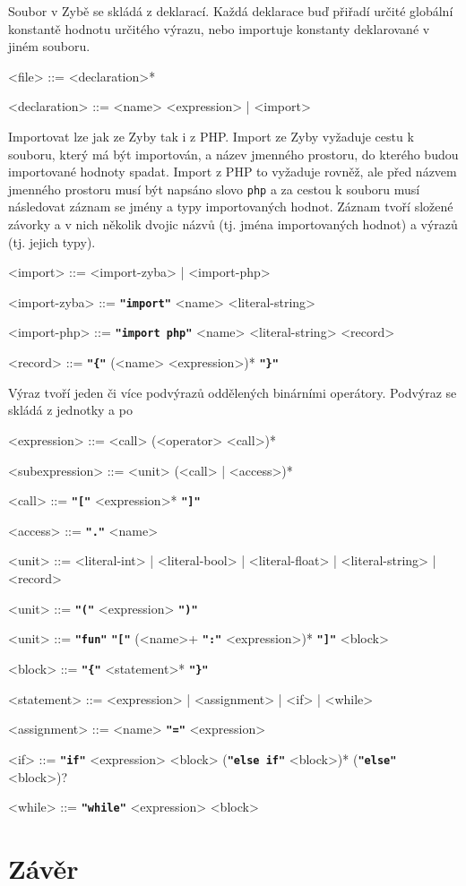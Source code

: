 \documentclass[a4paper,12pt]{article}
\def\emphasis #1{\textbf{\texttt{"#1"}}}
\begin{document}
Soubor v Zybě se skládá z deklarací. Každá deklarace buď přiřadí určité globální konstantě hodnotu určitého výrazu, nebo importuje konstanty deklarované v jiném souboru.
\begin{grammar}
<file> ::= <declaration>*

<declaration> ::= <name> <expression> | <import>
\end{grammar}

Importovat lze jak ze Zyby tak i z PHP. Import ze Zyby vyžaduje cestu k souboru, který má být importován, a název jmenného prostoru, do kterého budou importované hodnoty spadat. Import z PHP to vyžaduje rovněž, ale před názvem jmenného prostoru musí být napsáno slovo \texttt{php} a za cestou k souboru musí následovat záznam se jmény a typy importovaných hodnot. Záznam tvoří složené závorky a v nich několik dvojic názvů (tj. jména importovaných hodnot) a výrazů (tj. jejich typy).
\begin{grammar}
<import> ::= <import-zyba> | <import-php>

<import-zyba> ::= \emphasis{import} <name> <literal-string>

<import-php> ::= \emphasis{import php} <name> <literal-string> <record>

<record> ::= \emphasis{\{} (<name> <expression>)* \emphasis{\}}
\end{grammar}

Výraz tvoří jeden či více podvýrazů oddělených binárními operátory. Podvýraz se skládá z jednotky a po
\begin{grammar}
<expression> ::= <call> (<operator> <call>)*

<subexpression> ::= <unit> (<call> | <access>)*

<call> ::= \emphasis{[} <expression>* \emphasis{]}

<access> ::= \emphasis{.} <name>
\end{grammar}

\begin{grammar}
<unit> ::= <literal-int> | <literal-bool> | <literal-float> | <literal-string> | <record>

<unit> ::= \emphasis{(} <expression> \emphasis{)}

<unit> ::= \emphasis{fun} \emphasis{[} (<name>+ \emphasis{:} <expression>)* \emphasis{]} <block>


<block> ::= \emphasis{\{} <statement>* \emphasis{\}}

<statement> ::= <expression> | <assignment> | <if> | <while>

<assignment> ::= <name> \emphasis{=} <expression>

<if> ::= \emphasis{if} <expression> <block> (\emphasis{else if} <block>)* (\emphasis{else} <block>)?

<while> ::= \emphasis{while} <expression> <block>
\end{grammar} 

\section{Závěr}

\newpage
\printbibliography[heading=bibintoc, title={Použitá literatura}]
\newpage
\end{document}
